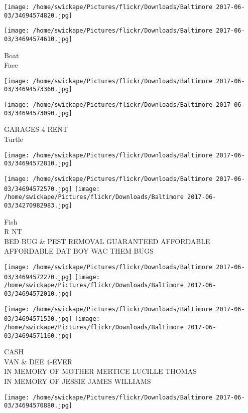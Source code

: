 \documentclass[10pt,letterpaper]{article}
\begin{document}
\texttt{[image: /home/swickape/Pictures/flickr/Downloads/Baltimore 2017-06-03/34694574820.jpg]}

\vspace{0.25in}
\texttt{[image: /home/swickape/Pictures/flickr/Downloads/Baltimore 2017-06-03/34694574610.jpg]}

Boat\\
Face
\pagebreak

\texttt{[image: /home/swickape/Pictures/flickr/Downloads/Baltimore 2017-06-03/34694573360.jpg]}

\vspace{0.25in}
\texttt{[image: /home/swickape/Pictures/flickr/Downloads/Baltimore 2017-06-03/34694573090.jpg]}

GARAGES 4 RENT\\
Turtle
\pagebreak

\texttt{[image: /home/swickape/Pictures/flickr/Downloads/Baltimore 2017-06-03/34694572810.jpg]}

\vspace{0.25in}
\texttt{[image: /home/swickape/Pictures/flickr/Downloads/Baltimore 2017-06-03/34694572570.jpg]}
\texttt{[image: /home/swickape/Pictures/flickr/Downloads/Baltimore 2017-06-03/34270982983.jpg]}

Fish\\
R NT\\
BED BUG \& PEST REMOVAL GUARANTEED AFFORDABLE AFFORDABLE DAT BOY WAC THEM BUGS
\pagebreak

\texttt{[image: /home/swickape/Pictures/flickr/Downloads/Baltimore 2017-06-03/34694572270.jpg]}
\texttt{[image: /home/swickape/Pictures/flickr/Downloads/Baltimore 2017-06-03/34694572010.jpg]}

\texttt{[image: /home/swickape/Pictures/flickr/Downloads/Baltimore 2017-06-03/34694571530.jpg]}
\texttt{[image: /home/swickape/Pictures/flickr/Downloads/Baltimore 2017-06-03/34694571160.jpg]}

CASH\\
VAN \& DEE 4{-}EVER\\
IN MEMORY OF MOTHER MERTICE LUCILLE THOMAS\\
IN MEMORY OF JESSIE JAMES WILLIAMS
\pagebreak

\texttt{[image: /home/swickape/Pictures/flickr/Downloads/Baltimore 2017-06-03/34694570880.jpg]}
\end{document}
